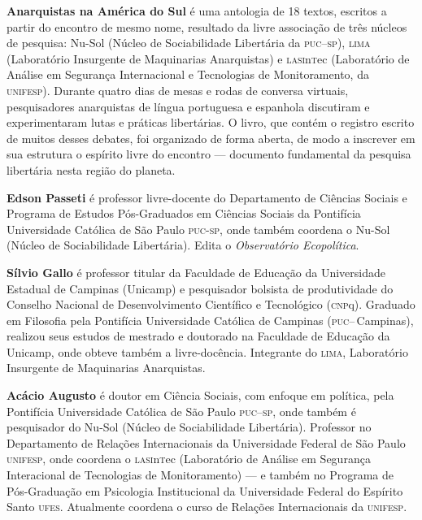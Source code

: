 \textbf{Anarquistas na América do Sul} é uma antologia de 18 textos, escritos a partir do encontro de mesmo nome, resultado da livre associação de três núcleos de pesquisa: Nu-Sol (Núcleo de Sociabilidade Libertária da \textsc{puc--sp}), \textsc{lima} (Laboratório Insurgente de Maquinarias Anarquistas) e \textsc{lasi}n\textsc{t}ec (Laboratório de Análise em Segurança Internacional e Tecnologias de Monitoramento, da \textsc{unifesp}). Durante quatro dias de mesas e rodas de conversa virtuais, pesquisadores anarquistas de língua portuguesa e espanhola discutiram e experimentaram lutas e práticas libertárias. O livro, que contém o registro escrito de muitos desses debates, foi organizado de forma aberta, de modo a inscrever em sua estrutura o espírito livre do encontro --- documento fundamental da pesquisa libertária nesta região do planeta.

\textbf{Edson Passeti} é professor livre-docente do Departamento de
Ciências Sociais e Programa de Estudos Pós-Graduados em Ciências Sociais
da Pontifícia Universidade Católica de São Paulo \textsc{puc-sp}, onde também coordena o Nu-Sol (Núcleo de Sociabilidade Libertária). Edita o \textit{Observatório Ecopolítica}.

\textbf{Sílvio Gallo} é professor titular da Faculdade de Educação da Universidade Estadual de Campinas (Unicamp) e pesquisador bolsista de produtividade do Conselho Nacional de Desenvolvimento Científico e Tecnológico (\textsc{cnp}q). Graduado em Filosofia pela Pontifícia Universidade Católica de Campinas (\textsc{puc}--\,Campinas), realizou seus estudos de mestrado e doutorado na Faculdade de Educação da Unicamp, onde obteve também a livre-docência. Integrante do \textsc{lima}, Laboratório Insurgente de Maquinarias Anarquistas.

\textbf{Acácio Augusto} é doutor em Ciência Sociais, com enfoque em política, pela Pontifícia Universidade Católica de São Paulo
\textsc{puc--sp}, onde também é pesquisador do Nu-Sol (Núcleo de Sociabilidade Libertária). Professor no Departamento de Relações Internacionais da Universidade Federal de São Paulo \textsc{unifesp}, onde coordena o \textsc{lasi}n\textsc{t}ec (Laboratório de Análise em Segurança Interacional de Tecnologias de Monitoramento) --- e também no Programa de Pós-Graduação em Psicologia Institucional da Universidade Federal do Espírito Santo \textsc{ufes}. Atualmente coordena o curso de Relações Internacionais da \textsc{unifesp}.

\endgroup
\pagebreak